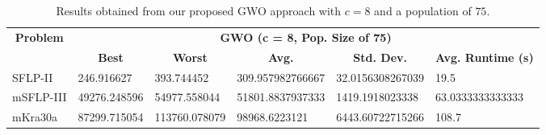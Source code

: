 \begin{table}[h!]
	\begin{adjustwidth}{-1.18in}{}
		\centering
		\begin{tabular}{|l|l|l|l|l|l|}
			\hline
			\multicolumn{1}{|c|}{\multirow{2}{*}{\textbf{Problem}}} & \multicolumn{5}{c|}{\textbf{GWO (c = 8, Pop. Size of 75)}} \\ \cline{2-6} 
			\multicolumn{1}{|c|}{}                                  & \multicolumn{1}{c|}{\textbf{Best}} & \multicolumn{1}{c|}{\textbf{Worst}} & \multicolumn{1}{c|}{\textbf{Avg.}} & \multicolumn{1}{c|}{\textbf{Std. Dev.}} & \multicolumn{1}{c|}{\textbf{Avg. Runtime (s)}} \\ \hline
			SFLP-II                                                 & 246.916627                                  & 393.744452                                   & 309.957982766667                     & 32.0156308267039                                 & 19.5                                  \\ \hline
			mSFLP-III                                               & 49276.248596                                & 54977.558044                                 & 51801.8837937333						         & 1419.1918023338                              & 63.0333333333333                               \\ \hline
			mKra30a                                               & 87299.715054                                & 113760.078079                                 &
			98968.6223121							&
			6443.60722715266							&
			108.7						\\ \hline
		\end{tabular}
	\end{adjustwidth}
	\caption{Results obtained from our proposed GWO approach with $c = 8$ and a population of $75$.}
	\label{approach-gwo-c8-p75-results}
\end{table}

